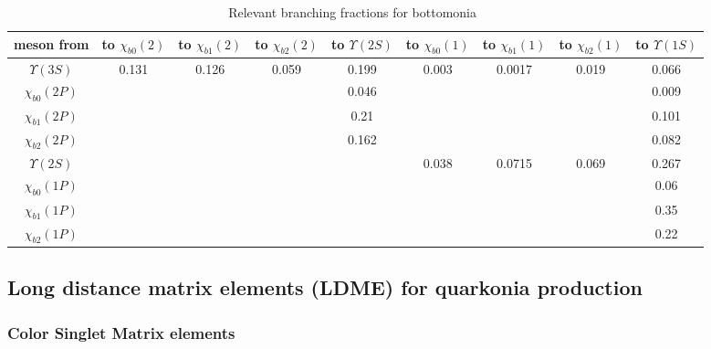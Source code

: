 \documentclass[aps,prc,preprint,superscriptaddress,showpacs,showkeys,amsmath]{revtex4-1}
\begin{document}
\begin{table}[h]
\begin{tabular}{c|cccccccc}
meson from  &to $\chi_{b0}(2)$ &to $\chi_{b1}(2)$ &to $\chi_{b2}(2)$
            &to $\Upsilon(2S)$
            &to $\chi_{b0}(1)$ &to $\chi_{b1}(1)$ &to $\chi_{b2}(1)$ 
            &to $\Upsilon(1S)$\\ 
\hline
$\Upsilon(3S)$ & 0.131 & 0.126 & 0.059 
               & 0.199
               & 0.003 & 0.0017 & 0.019
               & 0.066\\
$\chi_{b0}(2P)$& & &
               & 0.046
               & & &
               & 0.009\\
$\chi_{b1}(2P)$& & &
               & 0.21
               & & &
               & 0.101\\
$\chi_{b2}(2P)$& & &  
               & 0.162
               & & &
               & 0.082\\
$\Upsilon(2S)$ & & &
               &
               & 0.038 & 0.0715 & 0.069 
               & 0.267\\
$\chi_{b0}(1P)$& & &  
               &
               & & &
               & 0.06\\
$\chi_{b1}(1P)$& & &
               &
               & & &
               & 0.35\\
$\chi_{b2}(1P)$& & &
               &
               & & &
               & 0.22\\
\end{tabular}
\caption{Relevant branching fractions for bottomonia~\cite{Nakamura:2010zzi}}
\label{table:BottomoniaBFs}
\end{table}


\subsection{Long distance matrix elements (LDME) for quarkonia production}
\label{section:Matrix}

\subsubsection{Color Singlet Matrix elements}
\end{document}
